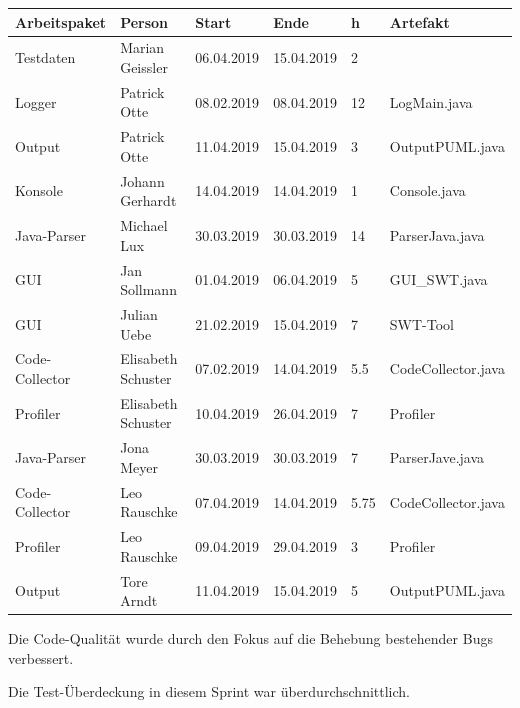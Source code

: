 \begin{longtable}{|p{4cm}|l|l|l|l|l|}
        \hline
        Arbeitspaket & Person & Start & Ende & h & Artefakt\\
        \hline
        Testdaten & Marian Geissler   & 06.04.2019 & 15.04.2019 & 2 &  \\ \hline
        Logger & Patrick Otte   & 08.02.2019 & 08.04.2019 & 12 & LogMain.java \\ \hline
        Output & Patrick Otte   & 11.04.2019 & 15.04.2019 & 3 & OutputPUML.java \\ \hline
        Konsole & Johann Gerhardt   & 14.04.2019 & 14.04.2019 & 1 & Console.java \\ \hline
        Java-Parser & Michael Lux   & 30.03.2019 & 30.03.2019 & 14 & ParserJava.java\\ \hline
        GUI & Jan Sollmann  & 01.04.2019 & 06.04.2019 & 5 & GUI\_SWT.java \\ \hline
        GUI & Julian Uebe  & 21.02.2019 & 15.04.2019 & 7 & SWT-Tool \\ \hline
        Code-Collector & Elisabeth Schuster  & 07.02.2019 & 14.04.2019 & 5.5  & CodeCollector.java \\ \hline
        Profiler & Elisabeth Schuster  & 10.04.2019 & 26.04.2019 & 7  & Profiler \\ \hline
       Java-Parser & Jona Meyer  & 30.03.2019 & 30.03.2019 & 7 & ParserJave.java \\ \hline
        Code-Collector & Leo Rauschke  & 07.04.2019 & 14.04.2019 & 5.75 & CodeCollector.java \\ \hline
        Profiler & Leo Rauschke  & 09.04.2019 & 29.04.2019 & 3 & Profiler\\ \hline
        Output & Tore Arndt  & 11.04.2019 & 15.04.2019 & 5 & OutputPUML.java\\ \hline
        
        
\end{longtable}     
\nsecend

Die Code-Qualität wurde durch den Fokus auf die Behebung bestehender Bugs verbessert.
\nsecend%

Die Test-Überdeckung in diesem Sprint war überdurchschnittlich.
\nsecend%

